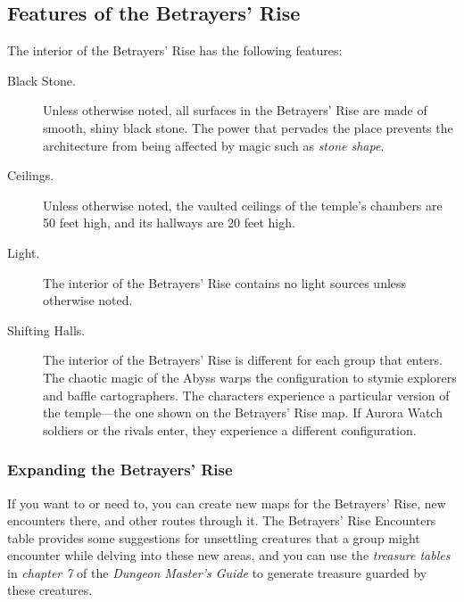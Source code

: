 \documentclass[10pt,a4paper,twoside,bg=print,twocolumn,openany,nodeprecatedcode]{dndbook}
\begin{document}
\subsection{Features of the Betrayers' Rise}
The interior of the Betrayers' Rise has the following features:


\begin{description}
\item[Black Stone.]
Unless otherwise noted, all surfaces in the Betrayers' Rise are made of smooth, shiny black stone. The power that pervades the place prevents the architecture from being affected by magic such as \textit{stone shape}.
\item[Ceilings.]
Unless otherwise noted, the vaulted ceilings of the temple's chambers are 50 feet high, and its hallways are 20 feet high.
\item[Light.]
The interior of the Betrayers' Rise contains no light sources unless otherwise noted.
\item[Shifting Halls.]
The interior of the Betrayers' Rise is different for each group that enters. The chaotic magic of the Abyss warps the configuration to stymie explorers and baffle cartographers. The characters experience a particular version of the temple—the one shown on the Betrayers' Rise map. If Aurora Watch soldiers or the rivals enter, they experience a different configuration.
\end{description}

\subsubsection{Expanding the Betrayers' Rise}
If you want to or need to, you can create new maps for the Betrayers' Rise, new encounters there, and other routes through it. The Betrayers' Rise Encounters table provides some suggestions for unsettling creatures that a group might encounter while delving into these new areas, and you can use the \textit{treasure tables} in \textit{chapter 7} of the \textit{Dungeon Master's Guide} to generate treasure guarded by these creatures.
\end{document}
